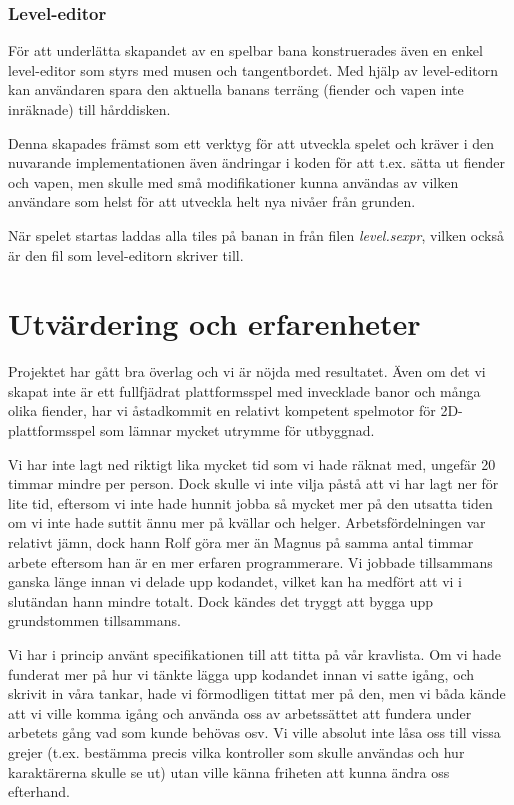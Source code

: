 \documentclass{scrartcl}
\newcommand{\filename}[1]%
{\textsl{#1}}
\begin{document}
\subsubsection{Level-editor}
För att underlätta skapandet av en spelbar bana konstruerades även en enkel level-editor som styrs med musen och tangentbordet. Med hjälp av level-editorn kan användaren spara den aktuella banans terräng (fiender och vapen inte inräknade) till hårddisken.

Denna skapades främst som ett verktyg för att utveckla spelet och kräver i den nuvarande implementationen även ändringar i koden för att t.ex. sätta ut fiender och vapen, men skulle med små modifikationer kunna användas av vilken användare som helst för att utveckla helt nya nivåer från grunden.

När spelet startas laddas alla tiles på banan in från filen \filename{level.sexpr}, vilken också är den fil som level-editorn skriver till.

\section{Utvärdering och erfarenheter}

Projektet har gått bra överlag och vi är nöjda med resultatet. Även om det vi skapat inte är ett fullfjädrat plattformsspel med invecklade banor och många olika fiender, har vi åstadkommit en relativt kompetent spelmotor för 2D-plattformsspel som lämnar mycket utrymme för utbyggnad.

Vi har inte lagt ned riktigt lika mycket tid som vi hade räknat med, ungefär 20 timmar mindre per person. Dock skulle vi inte vilja påstå att vi har lagt ner för lite tid, eftersom vi inte hade hunnit jobba så mycket mer på den utsatta tiden om vi inte hade suttit ännu mer på kvällar och helger. Arbetsfördelningen var relativt jämn, dock hann Rolf göra mer än Magnus på samma antal timmar arbete eftersom han är en mer erfaren programmerare. Vi jobbade tillsammans ganska länge innan vi delade upp kodandet, vilket kan ha medfört att vi i slutändan hann mindre totalt. Dock kändes det tryggt att bygga upp grundstommen tillsammans. 

Vi har i princip använt specifikationen till att titta på vår kravlista. Om vi hade funderat mer på hur vi tänkte lägga upp kodandet innan vi satte igång, och skrivit in våra tankar, hade vi förmodligen tittat mer på den, men vi båda kände att vi ville komma igång och använda oss av arbetssättet att fundera under arbetets gång vad som kunde behövas osv. Vi ville absolut inte låsa oss till vissa grejer (t.ex. bestämma precis vilka kontroller som skulle användas och hur karaktärerna skulle se ut) utan ville känna friheten att kunna ändra oss efterhand. 
\end{document}

